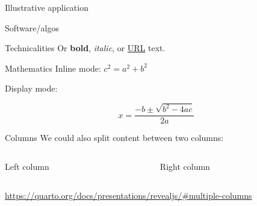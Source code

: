 \documentclass[
  10pt,
  ignorenonframetext,
]{beamer}
\begin{document}
\begin{frame}{Illustrative application}
\protect\hypertarget{illustrative-application}{}
\end{frame}

\begin{frame}{Software/algos}
\protect\hypertarget{softwarealgos}{}
\end{frame}

\begin{frame}{Technicalities}
\protect\hypertarget{technicalities}{}
Or \textbf{bold}, \emph{italic}, or \href{https://illinois.edu}{URL}
text.
\end{frame}

\begin{frame}{Mathematics}
\protect\hypertarget{mathematics}{}
Inline mode: \(c^2 = a^2 + b^2\)

Display mode:

\[x = \frac{-b \pm \sqrt{b^2 - 4ac}}{2a}\]
\end{frame}

\begin{frame}{Columns}
\protect\hypertarget{columns}{}
We could also split content between two columns:

\begin{columns}[T]
\begin{column}{0.45\textwidth}
Left column
\end{column}

\begin{column}{0.45\textwidth}
Right column
\end{column}
\end{columns}

\url{https://quarto.org/docs/presentations/revealjs/\#multiple-columns}
\end{frame}
\end{document}
